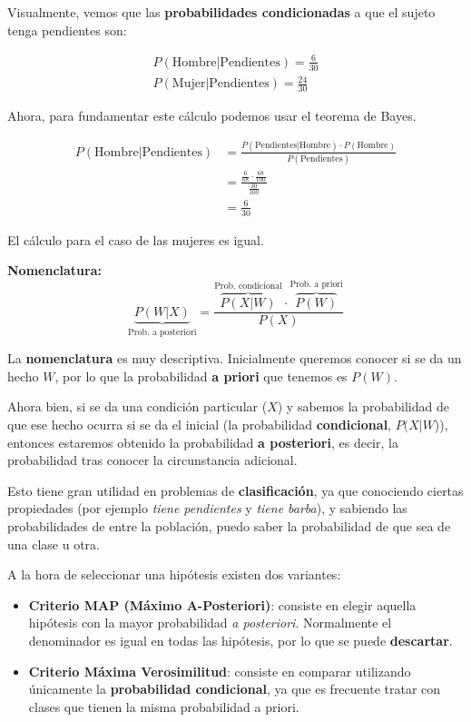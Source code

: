 \documentclass[11pt]{scrartcl}
\begin{document}
Visualmente, vemos que las \textbf{probabilidades condicionadas} a que el sujeto
tenga pendientes son:

\begin{gather*}
P(\text{Hombre} | \text{Pendientes}) = \frac{6}{30} \\
P(\text{Mujer} | \text{Pendientes}) = \frac{24}{30} 
\end{gather*}

Ahora, para fundamentar este cálculo podemos usar el teorema de Bayes.

\begin{align*}
P(\text{Hombre} | \text{Pendientes}) &= \frac{P(\text{Pendientes} | \text{Hombre}) \cdot P(\text{Hombre})}{P(\text{Pendientes})} \\
& = \frac{\frac{6}{68} \cdot \frac{68}{100}}{\frac{30}{100}} \\
& = \frac{6}{30}
\end{align*}

El cálculo para el caso de las mujeres es igual. 

\bigskip

\begin{framed}
  
\textbf{Nomenclatura:}
\[
\underbrace{P(W|X)}_\text{Prob. a posteriori} = \frac{\overbrace{P(X|W)}^\text{Prob. condicional} \cdot \overbrace{P(W)}^\text{Prob. a priori}}{P(X)}
\]

La \textbf{nomenclatura} es muy descriptiva. Inicialmente queremos conocer si se
da un hecho $W$, por lo que la probabilidad \textbf{a priori} que tenemos es
$P(W)$. 

Ahora bien, si se da una condición particular ($X$) y sabemos la probabilidad de
que ese hecho ocurra si se da el inicial (la probabilidad \textbf{condicional},
$P(X|W$)), entonces estaremos obtenido la probabilidad \textbf{a posteriori}, es
decir, la probabilidad tras conocer la circunstancia adicional.

\end{framed}

Esto tiene gran utilidad en problemas de \textbf{clasificación}, ya que
conociendo ciertas propiedades (por ejemplo \textit{tiene pendientes} y
\textit{tiene barba}), y sabiendo las probabilidades de entre la población,
puedo saber la probabilidad de que sea de una clase u otra.

A la hora de seleccionar una hipótesis existen dos variantes:

\begin{itemize}
\item \textbf{Criterio MAP (Máximo A-Posteriori)}: consiste en elegir aquella
  hipótesis con la mayor probabilidad \textit{a posteriori}. Normalmente el
  denominador es igual en todas las hipótesis, por lo que se puede
  \textbf{descartar}.
\item \textbf{Criterio Máxima Verosimilitud}: consiste en comparar utilizando
  únicamente la \textbf{probabilidad condicional}, ya que es frecuente tratar
  con clases que tienen la misma probabilidad a priori.
\end{itemize}
\end{document}
